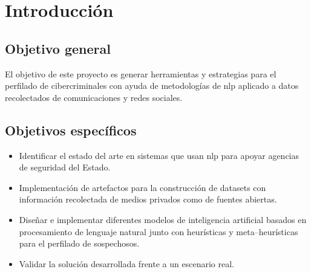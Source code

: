 \chapter{Introducción} %

\label{chIntroduction} %


\section{Objetivo general}
El objetivo de este proyecto es generar herramientas y estrategias para el perfilado de cibercriminales con ayuda de metodologías de \gls{nlp} aplicado a datos recolectados de comunicaciones y redes sociales.

\section{Objetivos específicos}
\begin{itemize}
\item Identificar el estado del arte en sistemas que usan \gls{nlp} para apoyar agencias de seguridad del Estado.

\item Implementación de artefactos para la construcción de \gls{dataset}s con información recolectada de medios privados como de fuentes abiertas.

\item Diseñar e implementar diferentes modelos de inteligencia artificial basados en procesamiento de lenguaje natural junto con heurísticas y meta--heurísticas para el perfilado de sospechosos.

\item Validar la solución desarrollada frente a un escenario real. 
\end{itemize}

